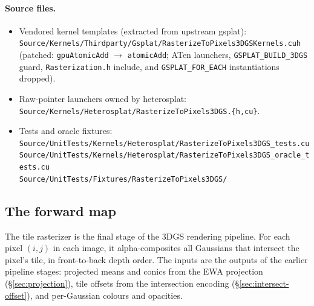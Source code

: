 \documentclass[11pt]{article}
\begin{document}
\paragraph{Source files.}
\begin{itemize}
  \item Vendored kernel templates (extracted from upstream gsplat):\\
  \texttt{Source/Kernels/Thirdparty/Gsplat/RasterizeToPixels3DGSKernels.cuh}
  (patched: \texttt{gpuAtomicAdd} $\to$ \texttt{atomicAdd}; ATen
  launchers, \texttt{GSPLAT\_BUILD\_3DGS} guard, \texttt{Rasterization.h}
  include, and \texttt{GSPLAT\_FOR\_EACH} instantiations dropped).
  \item Raw-pointer launchers owned by heterosplat:\\
  \texttt{Source/Kernels/Heterosplat/RasterizeToPixels3DGS.\{h,cu\}}.
  \item Tests and oracle fixtures:\\
  \texttt{Source/UnitTests/Kernels/Heterosplat/RasterizeToPixels3DGS\_tests.cu}\\
  \texttt{Source/UnitTests/Kernels/Heterosplat/RasterizeToPixels3DGS\_oracle\_tests.cu}\\
  \texttt{Source/UnitTests/Fixtures/RasterizeToPixels3DGS/}
\end{itemize}

\subsection{The forward map}

The tile rasterizer is the final stage of the 3DGS rendering pipeline.
For each pixel $(i, j)$ in each image, it alpha-composites all
Gaussians that intersect the pixel's tile, in front-to-back depth
order. The inputs are the outputs of the earlier pipeline stages:
projected means and conics from the EWA projection
(\S\ref{sec:projection}), tile offsets from the intersection encoding
(\S\ref{sec:intersect-offset}), and per-Gaussian colours and
opacities.
\end{document}
